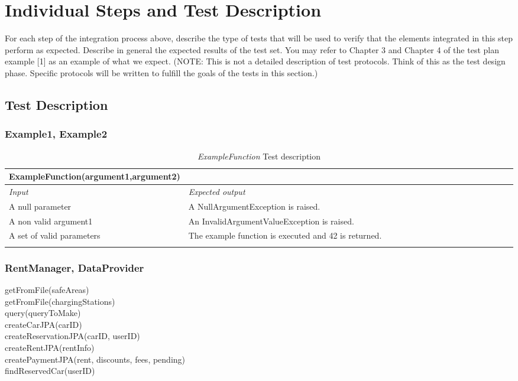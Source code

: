 \section{Individual Steps and Test Description}

For each step of the integration process above, describe the type of tests that will be used to verify that the elements integrated in this step perform as expected. Describe in general the expected results of the test set. You may refer to Chapter 3 and Chapter 4 of the test plan example [1] as an example of what we expect.
(NOTE: This is not a detailed description of test protocols. Think of this as the test design phase. Specific protocols will be written to fulfill the goals of the tests in this section.)

\subsection{Test Description}

\subsubsection{Example1, Example2}

\begin{longtable}{p{0.3\linewidth}p{0.7\linewidth}}
\hline \textbf{ExampleFunction(argument1,argument2)} \\
\toprule
\emph{Input} & \emph{Expected output} \\
\midrule
A null parameter & A NullArgumentException is raised.\\
\midrule
A non valid argument1 & An InvalidArgumentValueException is
raised. \\
\midrule
A set of valid parameters & The example function is executed and 42 is returned. \\
\bottomrule
\caption{\emph{ExampleFunction} Test description}
\end{longtable}

\subsubsection{RentManager, DataProvider}
getFromFile(safeAreas) \\
getFromFile(chargingStations) \\
query(queryToMake) \\
createCarJPA(carID) \\
createReservationJPA(carID, userID) \\
createRentJPA(rentInfo) \\
createPaymentJPA(rent, discounts, fees, pending) \\ %
findReservedCar(userID) %

